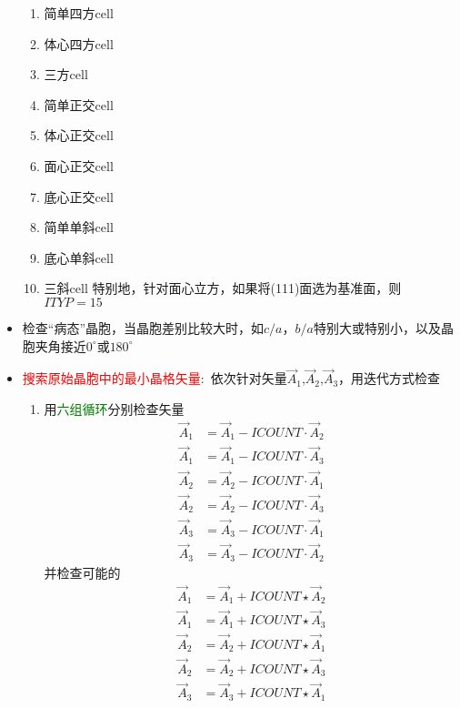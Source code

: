 \begin{itemize}
\begin{enumerate}
			\item 简单四方\textrm{cell}
			\item 体心四方\textrm{cell}
			\item 三方\textrm{cell}
			\item 简单正交\textrm{cell}
			\item 体心正交\textrm{cell}
			\item 面心正交\textrm{cell}
			\item 底心正交\textrm{cell}
			\item 简单单斜\textrm{cell}
			\item 底心单斜\textrm{cell}
			\item 三斜\textrm{cell}
		特别地，针对面心立方，如果将(111)面选为基准面，则$\mathit{ITYP}=15$
		\end{enumerate}
	\item 检查“病态”晶胞，当晶胞差别比较大时，如$c/a$，$b/a$特别大或特别小，以及晶胞夹角接近$0^{\circ}$或$180^{\circ}$
	\item \textcolor{red}{搜索原始晶胞中的最小晶格矢量}:~依次针对矢量$\vec A_1$,$\vec A_2$,$\vec A_3$，用迭代方式检查
		\begin{enumerate}
			\item 用\textcolor{green}{六组循环}分别检查矢量
				\begin{displaymath}
					\begin{aligned}
						\vec A_1&=\vec A_1-\mathit{ICOUNT}\cdot\vec A_2\\
						\vec A_1&=\vec A_1-\mathit{ICOUNT}\cdot\vec A_3\\
						\vec A_2&=\vec A_2-\mathit{ICOUNT}\cdot\vec A_1\\
						\vec A_2&=\vec A_2-\mathit{ICOUNT}\cdot\vec A_3\\
						\vec A_3&=\vec A_3-\mathit{ICOUNT}\cdot\vec A_1\\
						\vec A_3&=\vec A_3-\mathit{ICOUNT}\cdot\vec A_2
					\end{aligned}
				\end{displaymath}
				并检查可能的
				\begin{displaymath}
					\begin{aligned}
						\vec A_1&=\vec A_1+\mathit{ICOUNT}\star\vec A_2\\
						\vec A_1&=\vec A_1+\mathit{ICOUNT}\star\vec A_3\\
						\vec A_2&=\vec A_2+\mathit{ICOUNT}\star\vec A_1\\
						\vec A_2&=\vec A_2+\mathit{ICOUNT}\star\vec A_3\\
						\vec A_3&=\vec A_3+\mathit{ICOUNT}\star\vec A_1\\

\end{aligned}
\end{displaymath}
\end{enumerate}
\end{itemize}
